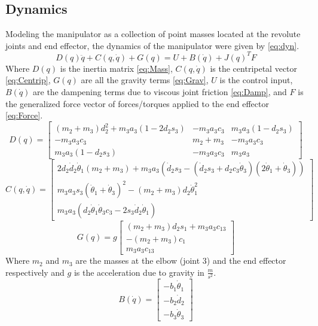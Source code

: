 \documentclass[letterpaper,12pt]{report}
\begin{document}
\subsection{Dynamics}
Modeling the manipulator as a collection of point masses located at the revolute joints and end effector,
the dynamics of the manipulator were given by \eqref{eq:dyn}.
\begin{equation} \label{eq:dyn}
D(q)\ddot q + C(q,\dot q) + G(q) = U + B(\dot q) + J(q)^TF
\end{equation}
Where $D(q)$ is the inertia matrix \eqref{eq:Mass}, $C(q,\dot q)$ is the centripetal vector \eqref{eq:Centrip}, $G(q)$ are all the gravity terms 
\eqref{eq:Grav}, $U$ is the control input, $B(\dot q)$ are the dampening terms due to viscous joint friction \eqref{eq:Damp}, and $F$ is the generalized force vector of 
forces/torques applied to the end effector \eqref{eq:Force}.
\begin{equation} \label{eq:Mass}
D(q) = 
	\begin{bmatrix}
		(m_2+m_3)d_2^2+m_3a_3(1-2d_2s_3)&-m_3a_3c_3&m_3a_3(1-d_2s_3)\\
		-m_3a_3c_3&m_2+m_3&-m_3a_3c_3\\
		m_3a_3(1-d_2s_3)&-m_3a_3c_3&m_3a_3
	\end{bmatrix}
\end{equation}
\begin{equation} \label{eq:Centrip}
C(q,\dot q) = 
	\begin{bmatrix}
		2d_2\dot d_2 \dot\theta_1(m_2+m_3) + m_3a_3(\dot d_2s_3-(\dot d_2s_3+d_2c_3\dot\theta_3)(2\dot\theta_1+\dot\theta_3))\\
		m_3a_3s_3(\dot\theta_1+\dot\theta_3)^2 - (m_2+m_3)d_2\dot\theta_1^2\\
		m_3a_3(d_2\dot\theta_1\dot\theta_3c_3 - 2s_3\dot d_2\dot\theta_1)
	\end{bmatrix}
\end{equation}
\begin{equation} \label{eq:Grav}
G(q) = g
	\begin{bmatrix}
		(m_2+m_3)d_2s_1 + m_3a_3c_{13}\\
		-(m_2+m_3)c_1\\
		m_3a_3c_{13}
	\end{bmatrix}
\end{equation}
Where $m_2$ and $m_3$ are the masses at the elbow (joint 3) and the end effector respectively and $g$ is the acceleration due to gravity in $\frac m{s^2}$.
\begin{equation} \label{eq:Damp}
B(\dot q) = 
	\begin{bmatrix}
		-b_1\dot\theta_1\\
		-b_2\dot d_2\\
		-b_3\dot\theta_3
	\end{bmatrix}
\end{equation}
\end{document}
